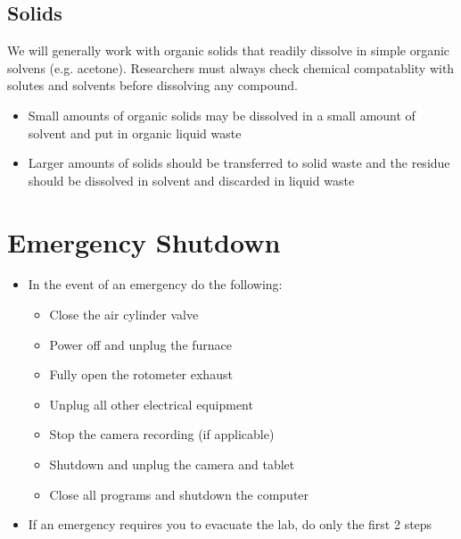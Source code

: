 \documentclass[letterpaper,11pt]{article}
\begin{document}
    \subsection{Solids} \label{sec:spill_solid}
    We will generally work with organic solids that readily dissolve in simple
    organic solvens (e.g. acetone). Researchers must always check chemical 
    compatablity with solutes and solvents before dissolving any compound.
    \begin{itemize}
    \item Small amounts of organic solids may be dissolved in a small amount of 
        solvent and put in organic liquid waste
    \item Larger amounts of solids should be transferred to solid waste and the
        residue should be dissolved in solvent and discarded in liquid waste
    \end{itemize}


\section{Emergency Shutdown} \label{sec:e_shtdn}

    \begin{itemize}
    \item In the event of an emergency do the following:
        
        \begin{itemize}
        \item Close the air cylinder valve
        \item Power off and unplug the furnace
        \item Fully open the rotometer exhaust
        \item Unplug all other electrical equipment
        \item Stop the camera recording (if applicable)
        \item Shutdown and unplug the camera and tablet
        \item Close all programs and shutdown the computer
        \end{itemize}
    
    \item If an emergency requires you to evacuate the lab, do only the first 
        2 steps
    \end{itemize}

\newpage    
\end{document}
